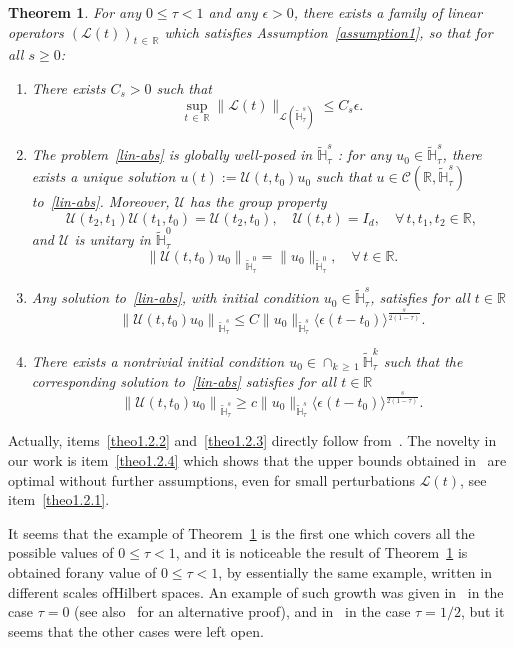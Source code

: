 \documentclass[10pt]{amsart}
\newtheorem{theo}{Theorem}[section]
\theoremstyle{definition}\newtheorem{defi}[theo]{Definition}\newtheorem{rema}[theo]{Remark}\newtheorem{exam}[theo]{Example}\newtheorem{exem}[theo]{Example}\newtheorem{nota}[theo]{Notation}
\newcommand{\R}{\mathbb{R}}
\newcommand{\HH}{\mathbb{H}}
\newcommand{\clL}{\mathcal{L}}
\newcommand{\clC}{\mathcal{C}}
\newcommand{\clU}{\mathcal{U}}
\renewcommand{\L}{\mathscr{L}}
\newcommand*\eps{\epsilon}
\newcommand*\dis{\displaystyle}
\newcommand{\<}{\langle}
\renewcommand{\>}{\rangle}
\newcommand*{\romanenumi}{\renewcommand*{\theenumi}{\roman{enumi}}}
\let\oldforall\forall
\renewcommand*{\forall}{\mathrel{\oldforall}}
\begin{document}
\begin{theo} \label{thm-abs}
For any $0 \leq \tau<1$ and any $\eps>0$, there exists a family of linear operators $(\L(t))_{t\,\in\,\R}$ which satisfies Assumption~\ref{assumption1}, so that for all $s\geq 0$:
\begin{enumerate}\romanenumi
\item\label{theo1.2.1} There exists $C_s>0$ such that
\[
\dis \sup_{t\,\in\,\R}\| \L(t) \|_{ \clL(\widetilde{\HH}_\tau^{s})} \leq C_s \eps.
\]

\item\label{theo1.2.2} The problem~\eqref{lin-abs} is globally well-posed in $\widetilde{\HH}_\tau^{s}$ : for any $u_0\in \widetilde{\HH}_\tau^{s}$, there exists a unique solution $u(t):=\clU(t,t_0)u_0$ such that $u\in \clC(\R, \widetilde{\HH}_\tau^{s})$ to~\eqref{lin-abs}. Moreover, $\clU$ has the group property
\[
\clU(t_2,t_1)\clU(t_1,t_0)=\clU(t_2,t_0), \quad \clU(t,t)=I_d, \quad \forall \, t,t_1, t_2 \in \R,
\]
and $\clU$ is unitary in $\widetilde{\HH}_\tau^{0}$
\[
\left\| \clU(t,t_0)u_0\right\|_{\widetilde{\HH}_\tau^{0}}=\| u_0\|_{\widetilde{\HH}_\tau^{0}},\quad \forall \, t \in \R.
\]
\item\label{theo1.2.3} Any solution to~\eqref{lin-abs}, with initial condition $u_0 \in \widetilde{\HH}_\tau^{s}$, satisfies for all $t\in \R$
\[
\left\| \clU(t,t_0)u_0\right\|_{\widetilde{\HH}_\tau^{s}}\leq C \| u_0\|_{\widetilde{\HH}_\tau^{s}}\<\eps(t-t_0)\>^{\frac s{2(1-\tau)}}.
\]

\item\label{theo1.2.4} There exists a nontrivial initial condition $u_0 \in \cap_{k\,\geq\,1}
\widetilde{\HH}_\tau^{k} $ such that the corresponding solution to~\eqref{lin-abs} satisfies for all $t\in \R$
\[
\left\| \clU(t,t_0)u_0\right\|_{\widetilde{\HH}_\tau^{s}} \geq c \| u_0\|_{\widetilde{\HH}_\tau^{s}}\<\eps(t-t_0)\>^{\frac s{2(1-\tau)}}.
\]
\end{enumerate}
\end{theo}


Actually, items~\eqref{theo1.2.2} and~\eqref{theo1.2.3} directly follow from~\cite[Theorem~1.5]{MasRo}. The novelty in our work is item~\eqref{theo1.2.4} which shows that the upper bounds obtained in~\cite[Theorem~1.5]{MasRo} are optimal without further assumptions, even for small perturbations $\L(t)$, see item~\eqref{theo1.2.1}.

It seems that the example of Theorem~\ref{thm-abs} is the first one which covers all the possible values of $0\leq \tau <1$, and it is noticeable the result of Theorem~\ref{thm-abs} is obtained for\linebreak any value of $0\leq \tau<1$, by essentially the same example, written in different scales of\linebreak Hilbert spaces. An example of such growth was given in~\cite{Delort2} in the case $\tau=0$ (see also~\cite{Maspero} for an alternative proof), and in~\cite[Appendix A]{BGMR2} in the case $\tau=1/2$, but it seems that the other cases were left open.
\end{document}
